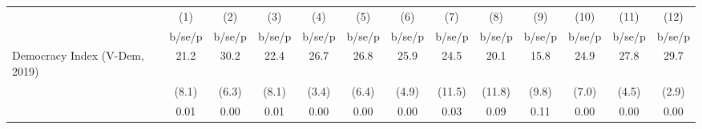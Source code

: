 \begin{tabular}{l*{12}{c}}
\hline\hline
                    &\multicolumn{1}{c}{(1)}&\multicolumn{1}{c}{(2)}&\multicolumn{1}{c}{(3)}&\multicolumn{1}{c}{(4)}&\multicolumn{1}{c}{(5)}&\multicolumn{1}{c}{(6)}&\multicolumn{1}{c}{(7)}&\multicolumn{1}{c}{(8)}&\multicolumn{1}{c}{(9)}&\multicolumn{1}{c}{(10)}&\multicolumn{1}{c}{(11)}&\multicolumn{1}{c}{(12)}\\
                    &      b/se/p&      b/se/p&      b/se/p&      b/se/p&      b/se/p&      b/se/p&      b/se/p&      b/se/p&      b/se/p&      b/se/p&      b/se/p&      b/se/p\\
\hline
Democracy Index (V-Dem, 2019)&        21.2&        30.2&        22.4&        26.7&        26.8&        25.9&        24.5&        20.1&        15.8&        24.9&        27.8&        29.7\\
                    &       (8.1)&       (6.3)&       (8.1)&       (3.4)&       (6.4)&       (4.9)&      (11.5)&      (11.8)&       (9.8)&       (7.0)&       (4.5)&       (2.9)\\
                    &        0.01&        0.00&        0.01&        0.00&        0.00&        0.00&        0.03&        0.09&        0.11&        0.00&        0.00&        0.00\\
\hline\hline
\end{tabular}
